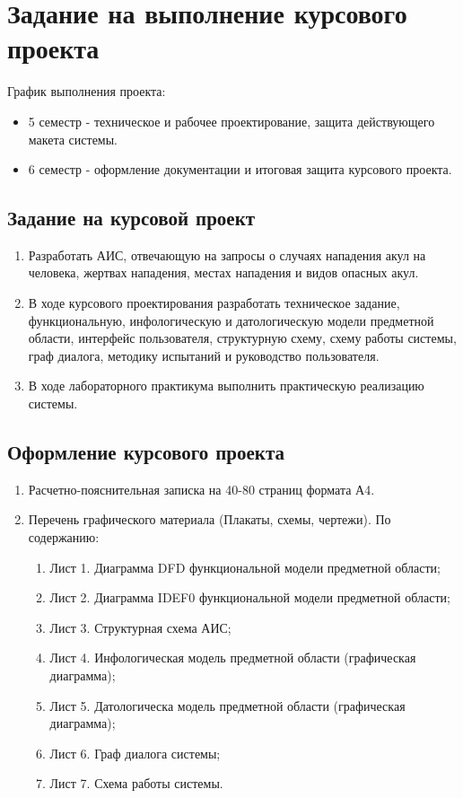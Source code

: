 \documentclass[russian,utf8,simple,emptystyle]{eskdtext}
\begin{document}
\tableofcontents
\newpage

\section{Задание на выполнение курсового проекта}

График выполнения проекта:
\begin{itemize}
\item 5 семестр - техническое и рабочее проектирование, защита действующего макета системы.
\item 6 семестр - оформление документации и итоговая защита курсового проекта.
\end{itemize}

\subsection{Задание на курсовой проект}
\begin{enumerate}
\item Разработать АИС, отвечающую на запросы о случаях нападения акул на человека, жертвах нападения, местах нападения и видов опасных акул.
\item В ходе курсового проектирования разработать техническое задание, функциональную, инфологическую и датологическую модели предметной области,
интерфейс пользователя, структурную схему, схему работы системы, граф диалога, методику испытаний и руководство пользователя.
\item В ходе лабораторного практикума выполнить практическую реализацию системы.
\end{enumerate}

\subsection{Оформление курсового проекта}
\begin{enumerate}
\item Расчетно-пояснительная записка на 40-80 страниц формата А4.
\item Перечень графического материала (Плакаты, схемы, чертежи). По содержанию:
	\begin{enumerate}
		\item Лист 1. Диаграмма DFD функциональной модели предметной области;
		\item Лист 2. Диаграмма IDEF0 функциональной модели предметной области;
		\item Лист 3. Структурная схема АИС;
		\item Лист 4. Инфологическая модель предметной области (графическая диаграмма);
		\item Лист 5. Датологическа модель предметной области (графическая диаграмма);
		\item Лист 6. Граф диалога системы;
		\item Лист 7. Схема работы системы.
	\end{enumerate}
\end{enumerate}
\end{document}
